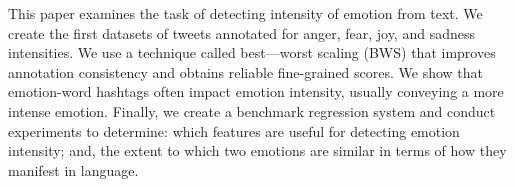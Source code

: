 This paper examines the task of detecting intensity of emotion from text. We create the first datasets of tweets annotated for anger, fear, joy, and sadness intensities. We use a technique called best---worst scaling (BWS) that improves annotation consistency and obtains reliable fine-grained scores. We show that emotion-word hashtags often impact emotion intensity, usually conveying a more intense emotion. Finally, we create a benchmark regression system and conduct experiments to determine: which features are useful for detecting emotion intensity; and, the extent to which two emotions are similar in terms of how they manifest in language.
